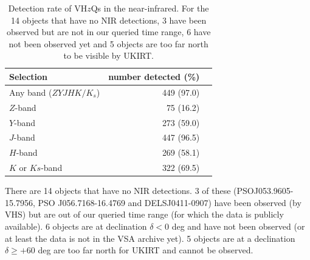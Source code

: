 \documentclass[usenatbib]{mnras}
\begin{document}
\begin{table}
  \centering
  \begin{tabular}{l r l}
    \hline  \hline
    Selection   & number detected (\%) \\
    \hline  
    Any band ($ZYJHK/K_{s}$)    &  449  (97.0) \\
    $Z$-band                            &  75  (16.2) \\
    $Y$-band                            &  273  (59.0) \\
    $J$-band                              &  447  (96.5) \\
    $H$-band                            &  269  (58.1) \\
    $K$ or $Ks$-band                &  322  (69.5) \\
    \hline  \hline
  \end{tabular}
  \caption{Detection rate of VH$z$Qs in the near-infrared. 
For the 14 objects that have no NIR detections, 3 have 
been observed but are not in our queried time range, 6 have 
not been observed yet and 5 objects are too far north to be visible 
by UKIRT. }
  \label{tab:nir_detection}
\end{table}

There are 14 objects that have no NIR detections. 3 of these
(PSOJ053.9605-15.7956, PSO J056.7168-16.4769 and DELSJ0411-0907) have
been observed (by VHS) but are out of our queried time range (for
which the data is publicly available). 6 objects are at declination
$\delta<0$ deg and have not been observed (or at least the data is not
in the VSA archive yet). 5 objects are at a declination $\delta \geq
+60$ deg are too far north for UKIRT and cannot be observed.
\end{document}
